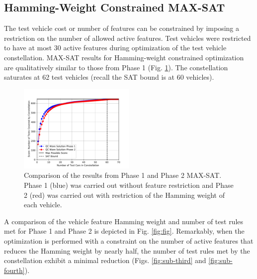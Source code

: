 \documentclass[aps,pra,twocolumn,superscriptaddress,groupedaddress]{revtex4}  %
\begin{document}
\subsection{Hamming-Weight Constrained MAX-SAT}
The test vehicle cost or number of features can be constrained by imposing a restriction
on the number of allowed active features. 
Test vehicles were restricted to have at most 30 active features during optimization
of the test vehicle constellation. MAX-SAT results for Hamming-weight constrained
optimization are qualitatively similar to those from Phase 1 (Fig. \ref{fig:solution2}).
The constellation saturates at 62 test vehicles (recall the SAT bound is at 60 vehicles).

\begin{figure}
\begin{center}
\includegraphics[width=0.5\textwidth]{figures/phase2/2p-score.pdf}
\caption{Comparison of the results from Phase 1 and Phase 2 MAX-SAT. Phase 1 (blue) was
         carried out without feature restriction and Phase 2 (red) was carried out with
         restriction of the Hamming weight of each vehicle.}
\label{fig:solution2}
\end{center}
\end{figure}

A comparison of the vehicle feature Hamming weight and number of test rules met for
Phase 1 and Phase 2 is depicted in Fig. \ref{fig:fig}. Remarkably, when the optimization
is performed with a constraint on the number of active features that reduces the
Hamming weight by nearly half, the number of test rules met by the constellation exhibit
a minimal reduction (Figs. \ref{fig:sub-third} and \ref{fig:sub-fourth}). 
\end{document}
